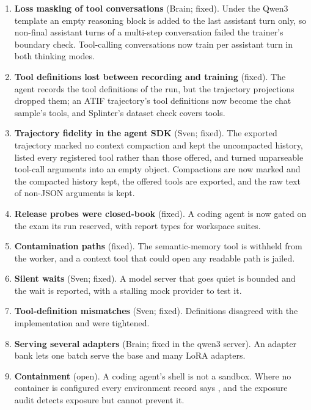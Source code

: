 \begin{enumerate}
\item \textbf{Loss masking of tool conversations} (Brain; fixed). Under the Qwen3 template
an empty reasoning block is added to the last assistant turn only, so non-final assistant
turns of a multi-step conversation failed the trainer's boundary check. Tool-calling
conversations now train per assistant turn in both thinking modes.
\item \textbf{Tool definitions lost between recording and training} (fixed). The agent
records the tool definitions of the run, but the trajectory projections dropped them; an
ATIF trajectory's tool definitions now become the chat sample's tools, and Splinter's
dataset check covers tools.
\item \textbf{Trajectory fidelity in the agent SDK} (Sven; fixed). The exported trajectory
marked no context compaction and kept the uncompacted history, listed every registered tool
rather than those offered, and turned unparseable tool-call arguments into an empty object.
Compactions are now marked and the compacted history kept, the offered tools are exported,
and the raw text of non-JSON arguments is kept.
\item \textbf{Release probes were closed-book} (fixed). A coding agent is now gated on the
exam its run reserved, with report types for workspace suites.
\item \textbf{Contamination paths} (fixed). The semantic-memory tool is withheld from the
worker, and a context tool that could open any readable path is jailed.
\item \textbf{Silent waits} (Sven; fixed). A model server that goes quiet is bounded and
the wait is reported, with a stalling mock provider to test it.
\item \textbf{Tool-definition mismatches} (Sven; fixed). Definitions disagreed with the
implementation and were tightened.
\item \textbf{Serving several adapters} (Brain; fixed in the qwen3 server). An adapter bank
lets one batch serve the base and many LoRA adapters.
\item \textbf{Containment} (open). A coding agent's shell is not a sandbox. Where no
container is configured every environment record says , and the
exposure audit detects exposure but cannot prevent it.
\end{enumerate}
